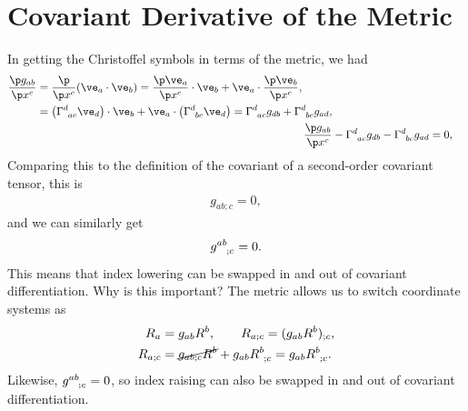\documentclass[a4paper, 11pt, normalem]{report}
\begin{document}
\section{Covariant Derivative of the Metric}
In getting the Christoffel symbols in terms of the metric, we had
\begin{align}
    \begin{split}
    \frac{\p g_{ab}}{\p x^c} &= \frac{\p}{\p x^c} (\ve_a\cdot\ve_b) = \frac{\p\ve_a}{\p x^c}\cdot\ve_b + \ve_a\cdot\frac{\p\ve_b}{\p x^c},\\
                             &= \left(\tensor{\Gamma}{^d_{ac}}\ve_d\right)\cdot\ve_b + \ve_a\cdot\left(\tensor{\Gamma}{^d_{bc}}\ve_d\right) = \tensor{\Gamma}{^d_{ac}}g_{db} + \tensor{\Gamma}{^d_{bc}}g_{ad},
    \end{split}\\
    \frac{\p g_{ab}}{\p x^c} &- \tensor{\Gamma}{^d_{ac}}g_{db} - \tensor{\Gamma}{^d_{bc}}g_{ad} = 0,
\end{align}
Comparing this to the definition of the covariant of a second-order covariant tensor, this is
\begin{align}
    g_{ab;c} = 0,
\end{align}
and we can similarly get
\begin{align}
    \tensor{g}{^{ab}_{;c}} = 0.
\end{align}
This means that index lowering can be swapped in and out of covariant differentiation. 
Why is this important?
The metric allows us to switch coordinate systems as
\begin{align}
    R_a &= g_{ab}R^b,\qquad R_{a;c} = (g_{ab}R^b)_{;c},\\
    R_{a;c} &= \cancel{g_{ab;c}R^b} + g_{ab}\tensor{R}{^b_{;c}} = g_{ab}\tensor{R}{^b_{;c}}.
\end{align}
Likewise, $\tensor{g}{^{ab}_{;c}} = 0$, so index raising can also be swapped in and out of covariant differentiation. 
\end{document}
